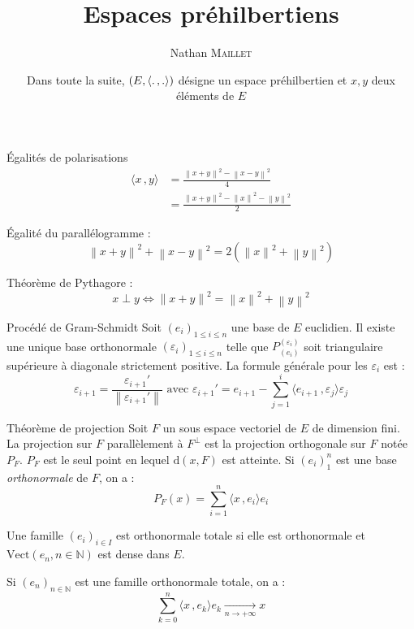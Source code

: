 \documentclass[french, a4paper, 11pt, twocolumn]{article}
\title{Espaces préhilbertiens}
\author{Nathan \textsc{Maillet}}
\date{Dans toute la suite, \(\left(E,\scal{.}{.}\right)\) désigne un espace préhilbertien et \(x,y\) deux éléments de \(E\)}
\newcommand{\norme}[1]{\left\| #1\right\|}
\newcommand{\scal}[2]{\langle #1\, ,#2 \rangle}
\newcommand{\limit}[1]{\underset{#1}{\rightarrow}}  %
\newcommand{\N}{\mathbb{N}}   %
\begin{document}
\maketitle

\begin{theorem}{Égalités de polarisations}
  \begin{align*}
    \scal{x}{y} &= \frac{\norme{x+y}^2-\norme{x-y}^2}{4} \\
                &= \frac{\norme{x+y}^2-\norme{x}^2-\norme{y}^2}{2}  
  \end{align*}

  \tcblower
  Égalité du parallélogramme :
    \[\norme{x+y}^2+\norme{x-y}^2=2\left(\norme{x}^2+\norme{y}^2\right)\]
   
  Théorème de Pythagore :
    \[x\perp y \iff \norme{x+y}^2=\norme{x}^2+\norme{y}^2\]
\end{theorem}

\begin{theorem}{Procédé de Gram-Schmidt}
  Soit \((e_i)_{1\leq i \leq n}\) une base de \(E\) euclidien.
  Il existe une unique base orthonormale \((\varepsilon_i)_{1\leq i \leq n}\) telle que \(P_{(e_i)}^{(\varepsilon_i)}\)
  soit triangulaire supérieure à diagonale strictement positive.
  La formule générale pour les \(\varepsilon_i\) est :
    \[\varepsilon_{i+1}=\frac{\varepsilon_{i+1}'}{\norme{\varepsilon_{i+1}'}} \text{ avec }  
  \varepsilon_{i+1}'=e_{i+1}-\sum_{j=1}^{i}\scal{e_{i+1}}{\varepsilon_j}\varepsilon_j\]
\end{theorem}

\begin{theorem}{Théorème de projection}
  Soit \(F\) un sous espace vectoriel de \(E\) de dimension fini.
  La projection sur \(F\) parallèlement à \(F^{\perp}\) est la projection orthogonale sur \(F\) notée \(P_F\).
  \(P_F\) est le seul point en lequel \(\mathrm{d}(x,F)\) est atteinte.
  Si \((e_i)_1^n\) est une base \emph{orthonormale} de \(F\), on a :
    \[P_F(x)=\sum_{i=1}^n \scal{x}{e_i}e_i\]
\end{theorem}

\begin{definition}
  Une famille \((e_i)_{i\in I}\) est orthonormale totale si elle est orthonormale et \(\mathrm{Vect}\left(e_n, n \in \N\right)\)
  est dense dans \(E\).

  \tcblower
  Si \((e_n)_{n\in \N}\) est une famille orthonormale totale, on a :
    \[\sum_{k=0}^n \scal{x}{e_k}e_k \limit{n\rightarrow +\infty} x\]
\end{definition}
\end{document}
